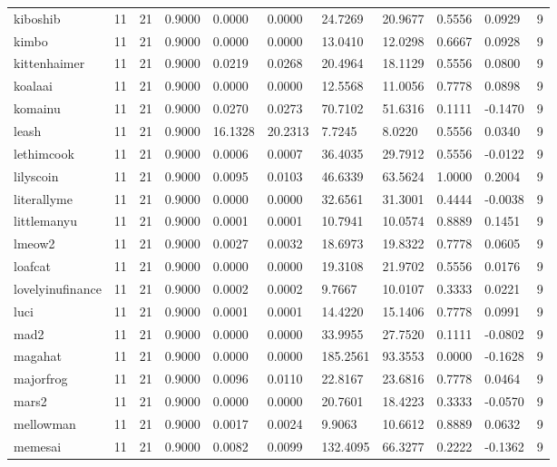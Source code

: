 \begin{table}[htbp]
\begin{tabular}{lllllllllll}
kiboshib & 11 & 21 & 0.9000 & 0.0000 & 0.0000 & 24.7269 & 20.9677 & 0.5556 & 0.0929 & 9 \\
kimbo & 11 & 21 & 0.9000 & 0.0000 & 0.0000 & 13.0410 & 12.0298 & 0.6667 & 0.0928 & 9 \\
kittenhaimer & 11 & 21 & 0.9000 & 0.0219 & 0.0268 & 20.4964 & 18.1129 & 0.5556 & 0.0800 & 9 \\
koalaai & 11 & 21 & 0.9000 & 0.0000 & 0.0000 & 12.5568 & 11.0056 & 0.7778 & 0.0898 & 9 \\
komainu & 11 & 21 & 0.9000 & 0.0270 & 0.0273 & 70.7102 & 51.6316 & 0.1111 & -0.1470 & 9 \\
leash & 11 & 21 & 0.9000 & 16.1328 & 20.2313 & 7.7245 & 8.0220 & 0.5556 & 0.0340 & 9 \\
lethimcook & 11 & 21 & 0.9000 & 0.0006 & 0.0007 & 36.4035 & 29.7912 & 0.5556 & -0.0122 & 9 \\
lilyscoin & 11 & 21 & 0.9000 & 0.0095 & 0.0103 & 46.6339 & 63.5624 & 1.0000 & 0.2004 & 9 \\
literallyme & 11 & 21 & 0.9000 & 0.0000 & 0.0000 & 32.6561 & 31.3001 & 0.4444 & -0.0038 & 9 \\
littlemanyu & 11 & 21 & 0.9000 & 0.0001 & 0.0001 & 10.7941 & 10.0574 & 0.8889 & 0.1451 & 9 \\
lmeow2 & 11 & 21 & 0.9000 & 0.0027 & 0.0032 & 18.6973 & 19.8322 & 0.7778 & 0.0605 & 9 \\
loafcat & 11 & 21 & 0.9000 & 0.0000 & 0.0000 & 19.3108 & 21.9702 & 0.5556 & 0.0176 & 9 \\
lovelyinufinance & 11 & 21 & 0.9000 & 0.0002 & 0.0002 & 9.7667 & 10.0107 & 0.3333 & 0.0221 & 9 \\
luci & 11 & 21 & 0.9000 & 0.0001 & 0.0001 & 14.4220 & 15.1406 & 0.7778 & 0.0991 & 9 \\
mad2 & 11 & 21 & 0.9000 & 0.0000 & 0.0000 & 33.9955 & 27.7520 & 0.1111 & -0.0802 & 9 \\
magahat & 11 & 21 & 0.9000 & 0.0000 & 0.0000 & 185.2561 & 93.3553 & 0.0000 & -0.1628 & 9 \\
majorfrog & 11 & 21 & 0.9000 & 0.0096 & 0.0110 & 22.8167 & 23.6816 & 0.7778 & 0.0464 & 9 \\
mars2 & 11 & 21 & 0.9000 & 0.0000 & 0.0000 & 20.7601 & 18.4223 & 0.3333 & -0.0570 & 9 \\
mellowman & 11 & 21 & 0.9000 & 0.0017 & 0.0024 & 9.9063 & 10.6612 & 0.8889 & 0.0632 & 9 \\
memesai & 11 & 21 & 0.9000 & 0.0082 & 0.0099 & 132.4095 & 66.3277 & 0.2222 & -0.1362 & 9 \\

\end{tabular}
\end{table}
